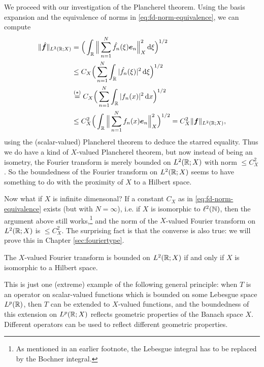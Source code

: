 We proceed with our investigation of the Plancherel theorem.
Using the basis expansion and the equivalence of norms in \eqref{eq:fd-norm-equivalence}, we can compute
\begin{equation*}
  \begin{aligned}
    \|\hat{\bm{f}}\|_{L^2(\mathbb{R};X)}
    &= \Big( \int_{\mathbb{R}} \Big\| \sum_{n=1}^{N} \hat{f_{n}}(\xi)  \bm{e}_{n} \Big\|_{X}^{2} \, \mathrm{d} \xi \Big)^{1/2} \\
    &\leq C_{X} \Big( \sum_{n=1}^{N} \int_{\mathbb{R}} | \hat{f_{n}}(\xi) |^{2} \, \mathrm{d} \xi \Big)^{1/2} \\
    &\stackrel{(*)}{=} C_{X} \Big( \sum_{n=1}^{N} \int_{\mathbb{R}} | f_{n}(x) |^{2} \, \mathrm{d} x \Big)^{1/2} \\
    &\leq C_{X}^{2} \Big( \int_{\mathbb{R}} \Big\| \sum_{n=1}^{N} f_{n}(x)  \bm{e}_{n} \Big\|_{X}^{2} \Big)^{1/2} = C_{X}^{2} \|\bm{f}\|_{L^2(\mathbb{R};X)},
  \end{aligned}
\end{equation*}
using the (scalar-valued) Plancherel theorem to deduce the starred equality.
Thus we do have a kind of $X$-valued Plancherel theorem, but now instead of being an isometry, the Fourier transform is merely bounded on $L^2(\mathbb{R};X)$ with norm $\leq C_{X}^{2}$.
So the boundedness of the Fourier transform on $L^2(\mathbb{R};X)$ seems to have something to do with the proximity of $X$ to a Hilbert space.

Now what if $X$ is infinite dimensonal?
If a constant $C_{X}$ as in \eqref{eq:fd-norm-equivalence} exists (but with $N = \infty$), i.e. if $X$ is isomorphic to $\ell^2(\mathbb{N})$, then the argument above still works,\footnote{As mentioned in an earlier footnote, the Lebesgue integral has to be replaced by the Bochner integral.} and the norm of the $X$-valued Fourier transform on $L^2(\mathbb{R};X)$ is $\leq C_{X}^{2}$.
The surprising fact is that the converse is also true: we will prove this in Chapter \ref{sec:fouriertype}.

\begin{thm}[Kwapie\'n, 1972]\label{thm:Kwapien-intro}
  The $X$-valued Fourier transform is bounded on $L^2(\mathbb{R};X)$ if and only if $X$ is isomorphic to a Hilbert space.
\end{thm}

This is just one (extreme) example of the following general principle: when $T$ is an operator on scalar-valued functions which is bounded on some Lebesgue space $L^p(\mathbb{R})$, then $T$ can be extended to $X$-valued functions, and the boundedness of this extension on $L^p(\mathbb{R};X)$ reflects geometric properties of the Banach space $X$.
Different operators can be used to reflect different geometric properties.

